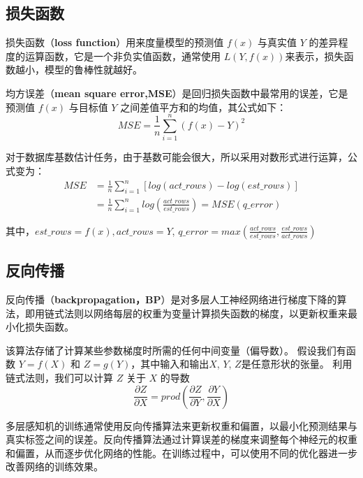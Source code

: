     \subsection{损失函数}
        \par 损失函数（\textbf{loss function}）用来度量模型的预测值 $f(x)$ 与真实值 $Y$ 的差异程度的运算函数，它是一个非负实值函数，通常使用 $L(Y, f(x))$来表示，损失函数越小，模型的鲁棒性就越好。
        \par 均方误差（\textbf{mean square error,MSE}）是回归损失函数中最常用的误差，它是预测值 $f(x)$ 与目标值 $Y$ 之间差值平方和的均值，其公式如下： $$MSE = \frac{1}{n}\sum_{i=1}^{n}(f(x) - Y)^2$$
        \par 对于数据库基数估计任务，由于基数可能会很大，所以采用对数形式进行运算，公式变为：\begin{align*} MSE &= \frac{1}{n}\sum_{i=1}^{n}[log(act\_rows) - log(est\_rows)] \\ &= \frac{1}{n}\sum_{i=1}^{n}log(\frac{act\_rows}{est\_rows}) = MSE(q\_error)\end{align*}
        \par 其中，$est\_rows=f(x), act\_rows=Y$, $q\_error = max(\frac{act\_rows}{est\_rows}, \frac{est\_rows}{act\_rows})$
        
    \subsection{反向传播}
        \par 反向传播（\textbf{backpropagation，BP}）是对多层人工神经网络进行梯度下降的算法，即用链式法则以网络每层的权重为变量计算损失函数的梯度，以更新权重来最小化损失函数。
        \par 该算法存储了计算某些参数梯度时所需的任何中间变量（偏导数）。 假设我们有函数 $Y=f(X)$ 和 $Z=g(Y)$，其中输入和输出$X$, $Y$, $Z$是任意形状的张量。 利用链式法则，我们可以计算 $Z$ 关于 $X$ 的导数\cite{ref10} $$\frac{\partial Z}{\partial X} = prod(\frac{\partial Z}{\partial Y}, \frac{\partial Y}{\partial X})$$
        \par 多层感知机的训练通常使用反向传播算法来更新权重和偏置，以最小化预测结果与真实标签之间的误差。反向传播算法通过计算误差的梯度来调整每个神经元的权重和偏置，从而逐步优化网络的性能。在训练过程中，可以使用不同的优化器进一步改善网络的训练效果。

